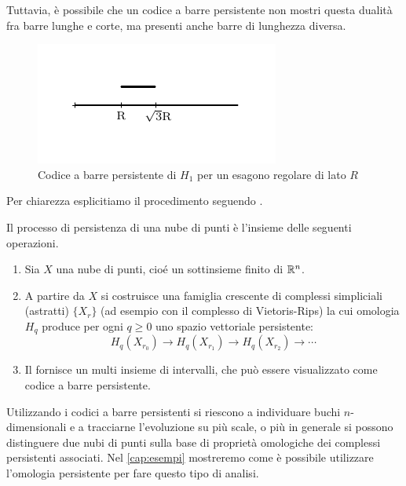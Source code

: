 Tuttavia, è possibile che un codice a barre persistente non mostri questa dualità fra barre lunghe e corte, ma presenti anche barre di lunghezza diversa.

\begin{figure}[ht]
  \includegraphics[width=.7\linewidth]{gfx/exhagon_barcode.pdf}
  \caption{Codice a barre persistente di $H_1$ per un esagono regolare di lato $R$}
  \label{fig:exhagonpersistence}
\end{figure}

Per chiarezza esplicitiamo il procedimento seguendo \cite{Curry}.
\begin{definition}
  Il processo di persistenza di una nube di punti è l'insieme delle seguenti operazioni.
  \begin{enumerate}
    \item Sia $X$ una nube di punti, cioé un sottinsieme finito di $\mathbb{R}^n$.
    \item A partire da $X$ si costruisce una famiglia crescente di complessi simpliciali (astratti) $\{X_r\}$ (ad esempio con il complesso di Vietoris-Rips) la cui omologia $H_q$ produce per ogni $q\geq 0$ uno spazio vettoriale persistente:
    \begin{equation*}
      H_q(X_{r_0}) \to H_q(X_{r_1})\to H_q(X_{r_2})\to \cdots
    \end{equation*}
    \item Il  fornisce un multi insieme di intervalli, che può essere visualizzato come codice a barre persistente.
  \end{enumerate}
\end{definition}

Utilizzando i codici a barre persistenti si riescono a individuare buchi $n$-dimensionali e a tracciarne l'evoluzione su più scale, o più in generale si possono distinguere due nubi di punti sulla base di proprietà omologiche dei complessi persistenti associati. Nel \cref{cap:esempi} mostreremo come è possibile utilizzare l'omologia persistente per fare questo tipo di analisi.

